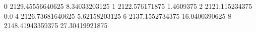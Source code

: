 0 2129.45556640625 8.34033203125
1 2122.576171875 1.4609375
2 2121.115234375 0.0
4 2126.73681640625 5.62158203125
6 2137.1552734375 16.0400390625
8 2148.41943359375 27.30419921875
